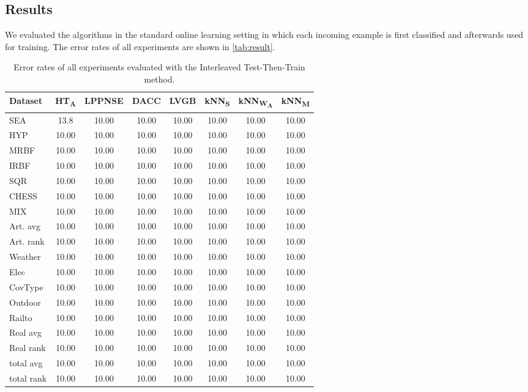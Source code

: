 \documentclass[conference]{IEEEtran}
\begin{document}
\subsection{Results}
We evaluated the algorithms in the standard online learning setting in which each incoming example is first classified and afterwards used for training. The error rates of all experiments are shown
in \ref{tab:result}.\\
\begin{table*}
\def\arraystretch{0.9}
\footnotesize
\centering
\caption{Error rates of all experiments evaluated with the Interleaved Test-Then-Train method.}
\label{tab:result}
\begin{tabular}{l|ccccccc}
Dataset & HT\textsubscript{A} & LPPNSE &DACC& LVGB & kNN\textsubscript{S} & kNN\textsubscript{W\textsubscript{A}}& kNN\textsubscript{M}\\\hline
SEA & 13.8 & 10.00 & 10.00 & 10.00 & 10.00 & 10.00 & 10.00\\
HYP & 10.00 & 10.00 & 10.00 & 10.00 & 10.00 & 10.00 & 10.00\\ 
MRBF & 10.00 & 10.00 & 10.00 & 10.00 & 10.00 & 10.00 & 10.00\\
IRBF & 10.00 & 10.00 & 10.00 & 10.00 & 10.00 & 10.00 & 10.00\\
SQR & 10.00 & 10.00 & 10.00 & 10.00 & 10.00 & 10.00 & 10.00\\
CHESS & 10.00 & 10.00 & 10.00 & 10.00 & 10.00 & 10.00 & 10.00\\
MIX & 10.00 & 10.00 & 10.00 & 10.00 & 10.00 & 10.00 & 10.00\\\hline
Art. avg & 10.00 & 10.00 & 10.00 & 10.00 & 10.00 & 10.00 & 10.00\\\hline
Art. rank & 10.00 & 10.00 & 10.00 & 10.00 & 10.00 & 10.00 & 10.00\\\hline
Weather & 10.00 & 10.00 & 10.00 & 10.00 & 10.00 & 10.00 & 10.00\\
Elec & 10.00 & 10.00 & 10.00 & 10.00 & 10.00 & 10.00 & 10.00\\
CovType & 10.00 & 10.00 & 10.00 & 10.00 & 10.00 & 10.00 & 10.00\\
Outdoor & 10.00 & 10.00 & 10.00 & 10.00 & 10.00 & 10.00 & 10.00\\
Railto & 10.00 & 10.00 & 10.00 & 10.00 & 10.00 & 10.00 & 10.00\\\hline
Real avg& 10.00 & 10.00 & 10.00 & 10.00 & 10.00 & 10.00 & 10.00\\\hline
Real rank& 10.00 & 10.00 & 10.00 & 10.00 & 10.00 & 10.00 & 10.00\\\hline
total avg& 10.00 & 10.00 & 10.00 & 10.00 & 10.00 & 10.00 & 10.00\\\hline
total rank& 10.00 & 10.00 & 10.00 & 10.00 & 10.00 & 10.00 & 10.00\\\hline
\end{tabular}
\label{tab:datasets}
\end{table*}
\end{document}
